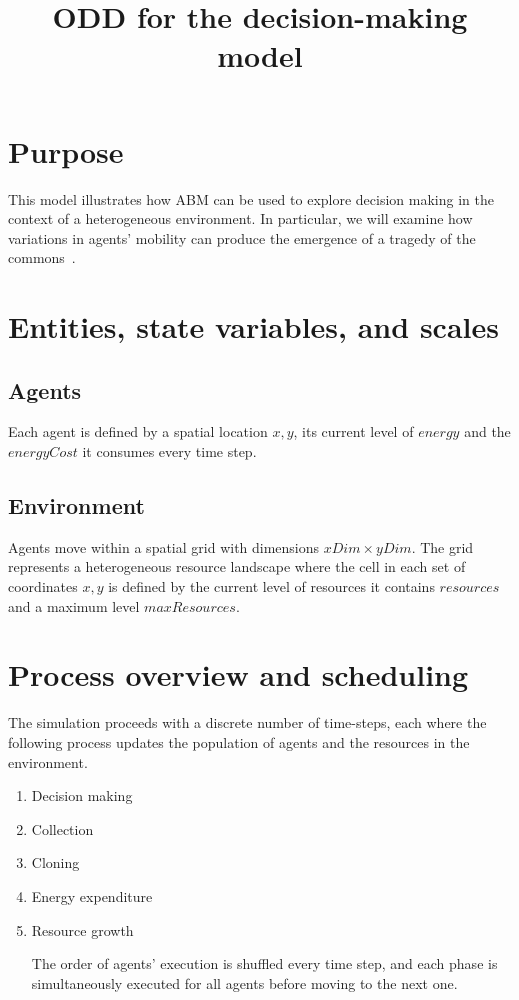 \documentclass[11pt,a4paper,twocolumn,notitlepage]{article}
\begin{document}
\title{ODD for the decision-making model}
\maketitle

\section{Purpose}

This model illustrates how ABM can be used to explore decision making in the context of a heterogeneous environment. In particular, we will examine how variations in agents' mobility can produce the emergence of a tragedy of the commons~\citep{hardin1968tragedy}.

\section{Entities, state variables, and scales}
\subsection{Agents}

Each agent is defined by a spatial location $x,y$, its current level of $energy$ and the $energyCost$ it consumes every time step.

\subsection{Environment}

Agents move within a spatial grid with dimensions $xDim \times yDim$. The grid represents a heterogeneous resource landscape where the cell in each set of coordinates $x,y$ is defined by the current level of resources it contains $resources$ and a maximum level $maxResources$. 

\section{Process overview and scheduling}

The simulation proceeds with a discrete number of time-steps, each where the following process updates the population of agents and the resources in the environment.

\begin{enumerate}
\item{Decision making}
\item{Collection}
\item{Cloning}
\item{Energy expenditure}
\item{Resource growth}

The order of agents' execution is shuffled every time step, and each phase is simultaneously executed for all agents before moving to the next one.

\end{enumerate}
\end{document}
